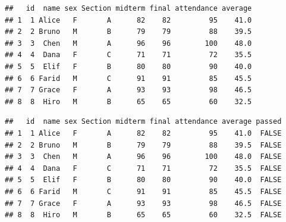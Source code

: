 \documentclass[
]{article}
\newenvironment{Shaded}{\begin{snugshade}}{\end{snugshade}}
\newcommand{\AttributeTok}[1]{\textcolor[rgb]{0.13,0.29,0.53}{#1}}
\newcommand{\CommentTok}[1]{\textcolor[rgb]{0.56,0.35,0.01}{\textit{#1}}}
\newcommand{\DecValTok}[1]{\textcolor[rgb]{0.00,0.00,0.81}{#1}}
\newcommand{\FunctionTok}[1]{\textcolor[rgb]{0.13,0.29,0.53}{\textbf{#1}}}
\newcommand{\NormalTok}[1]{#1}
\newcommand{\OtherTok}[1]{\textcolor[rgb]{0.56,0.35,0.01}{#1}}
\newcommand{\SpecialCharTok}[1]{\textcolor[rgb]{0.81,0.36,0.00}{\textbf{#1}}}
\begin{document}
\begin{Shaded}
\end{Shaded}

\begin{verbatim}
##   id  name sex Section midterm final attendance average
## 1  1 Alice   F       A      82    82         95    41.0
## 2  2 Bruno   M       B      79    79         88    39.5
## 3  3  Chen   M       A      96    96        100    48.0
## 4  4  Dana   F       C      71    71         72    35.5
## 5  5  Elif   F       B      80    80         90    40.0
## 6  6 Farid   M       C      91    91         85    45.5
## 7  7 Grace   F       A      93    93         98    46.5
## 8  8  Hiro   M       B      65    65         60    32.5
\end{verbatim}

\begin{Shaded}
\end{Shaded}

\begin{verbatim}
##   id  name sex Section midterm final attendance average passed
## 1  1 Alice   F       A      82    82         95    41.0  FALSE
## 2  2 Bruno   M       B      79    79         88    39.5  FALSE
## 3  3  Chen   M       A      96    96        100    48.0  FALSE
## 4  4  Dana   F       C      71    71         72    35.5  FALSE
## 5  5  Elif   F       B      80    80         90    40.0  FALSE
## 6  6 Farid   M       C      91    91         85    45.5  FALSE
## 7  7 Grace   F       A      93    93         98    46.5  FALSE
## 8  8  Hiro   M       B      65    65         60    32.5  FALSE
\end{verbatim}
\end{document}
